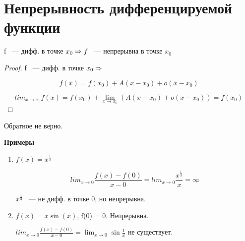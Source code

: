 ﻿\section{Непрерывность дифференцируемой функции}

\begin{assertion}
f ~--- дифф. в точке $x_0 \Rightarrow f$ ~--- непрерывна в точке $x_0$
\end{assertion}

\begin{proof}
   f ~--- дифф. в точке $x_0 \Rightarrow$

   $$f(x) = f(x_0) + A(x - x_0) + o(x - x_0)$$

   $$lim_{x \to x_0} f(x) = f(x_0) + \lim_{x \to x_0}(A(x - x_0) + o(x - x_0)) = f(x_0)$$
\end{proof}

\begin{Rem}
   Обратное не верно. 
\end{Rem}

{\bf Примеры}
\begin{enumerate}
\item $f(x) = x^{\frac{1}{3}}$

$$lim_{x \to 0}\frac{f(x) - f(0)}{x - 0} = lim_{x\to 0}\frac{x^{\frac13}}{x} = \infty$$

$x^{\frac13}$ ~--- не дифф. в точке 0, но непрерывна.
\item $f(x) = x \sin(x)$, f(0) = 0. Непрерывна.

$lim_{x \to 0}\frac{f(x) - f(0)}{x - 0} = \lim_{x \to 0} \sin\frac1x$ не существует.
\end{enumerate}
